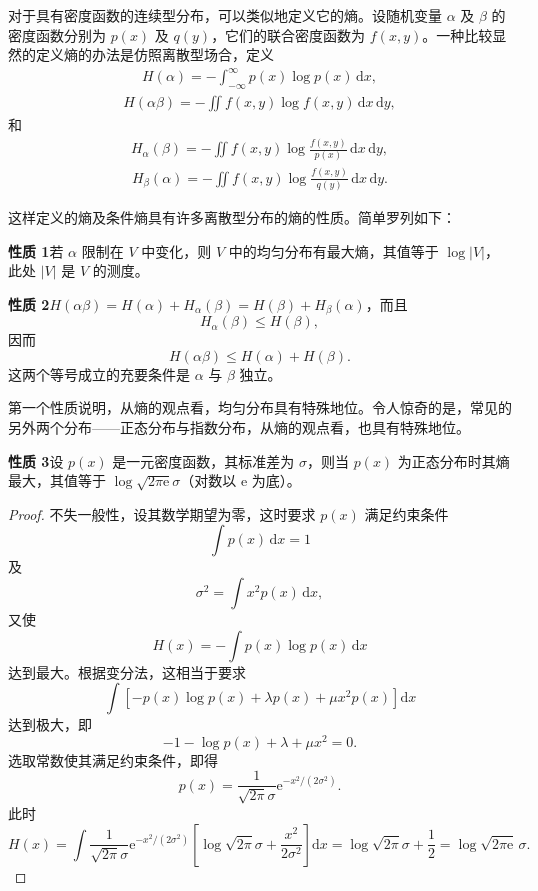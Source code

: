 \documentclass[../../main.tex]{subfiles}
\begin{document}
对于具有密度函数的连续型分布，可以类似地定义它的熵。设随机变量 $\alpha$ 及 $\beta$ 的密度函数分别为 $p(x)$ 及 $q(y)$，它们的联合密度函数为 $f(x,y)$。一种比较显然的定义熵的办法是仿照离散型场合，定义
\begin{align}
H(\alpha)=-\int_{-\infty}^{\infty}p(x)\log p(x)\,\mathrm{d}x,\label{align:ch04-连续熵}
\end{align}
\begin{align}
H(\alpha\beta)=-\iint f(x,y)\log f(x,y)\,\mathrm{d}x\,\mathrm{d}y,\label{align:ch04-连续联合熵}
\end{align}
和
\begin{align}
H_\alpha(\beta)=-\iint f(x,y)\log\frac{f(x,y)}{p(x)}\,\mathrm{d}x\,\mathrm{d}y,\label{align:ch04-连续条件熵}
\end{align}
\begin{align}
H_\beta(\alpha)=-\iint f(x,y)\log\frac{f(x,y)}{q(y)}\,\mathrm{d}x\,\mathrm{d}y.\label{align:ch04-连续条件熵2}
\end{align}

这样定义的熵及条件熵具有许多离散型分布的熵的性质。简单罗列如下：

\noindent\textbf{性质 1}\quad 若 $\alpha$ 限制在 $V$ 中变化，则 $V$ 中的均匀分布有最大熵，其值等于 $\log|V|$，此处 $|V|$ 是 $V$ 的测度。

\noindent\textbf{性质 2}\quad $H(\alpha\beta)=H(\alpha)+H_\alpha(\beta)=H(\beta)+H_\beta(\alpha)$，而且
\[
H_\alpha(\beta)\leqslant H(\beta),
\]
因而
\[
H(\alpha\beta)\leqslant H(\alpha)+H(\beta).
\]
这两个等号成立的充要条件是 $\alpha$ 与 $\beta$ 独立。

第一个性质说明，从熵的观点看，均匀分布具有特殊地位。令人惊奇的是，常见的另外两个分布——正态分布与指数分布，从熵的观点看，也具有特殊地位。

\noindent\textbf{性质 3}\quad 设 $p(x)$ 是一元密度函数，其标准差为 $\sigma$，则当 $p(x)$ 为正态分布时其熵最大，其值等于 $\log\sqrt{2\pi\mathrm{e}}\sigma$（对数以 $\mathrm{e}$ 为底）。

\begin{proof}
不失一般性，设其数学期望为零，这时要求 $p(x)$ 满足约束条件
\[
\int p(x)\,\mathrm{d}x=1
\]
及
\[
\sigma^2=\int x^2 p(x)\,\mathrm{d}x,
\]
又使
\[
H(x)=-\int p(x)\log p(x)\,\mathrm{d}x
\]
达到最大。根据变分法，这相当于要求
\[
\int\left[-p(x)\log p(x)+\lambda p(x)+\mu x^2 p(x)\right]\mathrm{d}x
\]
达到极大，即
\[
-1-\log p(x)+\lambda+\mu x^2=0.
\]
选取常数使其满足约束条件，即得
\[
p(x)=\frac{1}{\sqrt{2\pi}\sigma}\mathrm{e}^{-x^2/(2\sigma^2)}.
\]
此时
\[
H(x)=\int\frac{1}{\sqrt{2\pi}\sigma}\mathrm{e}^{-x^2/(2\sigma^2)}\left[\log\sqrt{2\pi}\sigma+\frac{x^2}{2\sigma^2}\right]\mathrm{d}x
=\log\sqrt{2\pi}\sigma+\frac12=\log\sqrt{2\pi\mathrm{e}}\,\sigma.
\]
\end{proof}
\end{document}
